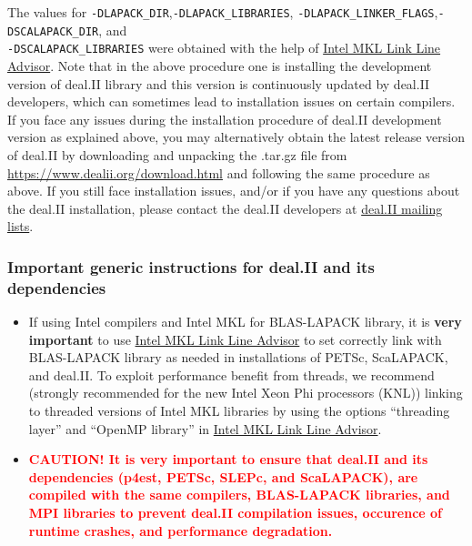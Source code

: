 The values for \verb|-DLAPACK_DIR|,\verb|-DLAPACK_LIBRARIES|, \verb|-DLAPACK_LINKER_FLAGS|,\verb|-DSCALAPACK_DIR|, and\\ \verb|-DSCALAPACK_LIBRARIES| were obtained with the help of \href{https://software.intel.com/en-us/articles/intel-mkl-link-line-advisor}{Intel MKL Link Line Advisor}.  Note that in the above procedure one is installing the development version of deal.II library and this version is continuously updated by deal.II developers, which can sometimes lead to installation issues on certain compilers. If you face any issues during the installation procedure of deal.II development version as explained above, you may alternatively obtain the latest release version of deal.II by downloading and unpacking the .tar.gz file from \url{https://www.dealii.org/download.html} and following the same procedure as above. If you still face installation issues, and/or if you have any questions about the deal.II installation, please contact the deal.II developers at \href{https://groups.google.com/d/forum/dealii}{deal.II mailing lists}.

\subsubsection{Important generic instructions for deal.II and its dependencies}
\begin{itemize}
\item If using Intel compilers and Intel MKL for BLAS-LAPACK library, it is {\bf very important} to use \href{https://software.intel.com/en-us/articles/intel-mkl-link-line-advisor}{Intel MKL Link Line Advisor} to set correctly link with BLAS-LAPACK library as needed in installations of PETSc, ScaLAPACK, and deal.II. To exploit performance benefit from threads, we recommend (strongly recommended for the new Intel Xeon Phi processors (KNL)) linking to threaded versions of Intel MKL libraries by using the options ``threading layer'' and  ``OpenMP library'' in \href{https://software.intel.com/en-us/articles/intel-mkl-link-line-advisor}{Intel MKL Link Line Advisor}. 

\item \textcolor{red}{\bf CAUTION! It is  very important to ensure that deal.II and its dependencies (p4est, PETSc, SLEPc, and ScaLAPACK), are compiled with the same compilers, BLAS-LAPACK libraries, and MPI libraries to prevent deal.II compilation issues, occurence of runtime crashes, and \dftfe{} performance degradation.}  
\end{itemize}

